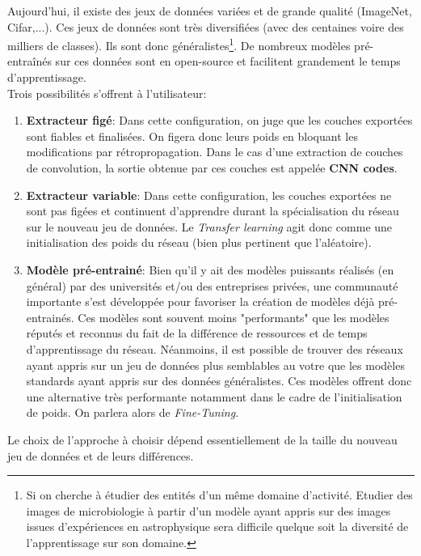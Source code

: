 \noindent Aujourd'hui, il existe des jeux de données variées et de grande qualité (ImageNet, Cifar,...). Ces jeux de données sont très diversifiées (avec des centaines voire des milliers de classes). Ils sont donc généralistes\footnote{Si on cherche à étudier des entités d'un même domaine d'activité. Etudier des images de microbiologie à partir d'un modèle ayant appris sur des images issues d'expériences en astrophysique sera difficile quelque soit la diversité de l'apprentissage sur son domaine.}. De nombreux modèles pré-entraînés sur ces données sont en open-source et facilitent grandement le temps d'apprentissage.\\

\noindent Trois possibilités s'offrent à l'utilisateur:
\begin{enumerate}
    \item \textbf{Extracteur figé}: Dans cette configuration, on juge que les couches exportées sont fiables et finalisées. On figera donc leurs poids en bloquant les modifications par rétropropagation. Dans le cas d'une extraction de couches de convolution, la sortie obtenue par ces couches est appelée \textbf{CNN codes}.

    \item \textbf{Extracteur variable}: Dans cette configuration, les couches exportées ne sont pas figées et continuent d'apprendre durant la spécialisation du réseau sur le nouveau jeu de données. Le \textit{Transfer learning} agit donc comme une initialisation des poids du réseau (bien plus pertinent que l'aléatoire).

    \item \textbf{Modèle pré-entrainé}: Bien qu'il y ait des modèles puissants réalisés (en général) par des universités et/ou des entreprises privées, une communauté importante s'est développée pour favoriser la création de modèles déjà pré-entrainés. Ces modèles sont souvent moins "performants" que les modèles réputés et reconnus du fait de la différence de ressources et de temps d'apprentissage du réseau. Néanmoins, il est possible de trouver des réseaux ayant appris sur un jeu de données plus semblables au votre que les modèles standards ayant appris sur des données généralistes. Ces modèles offrent donc une alternative très performante notamment dans le cadre de l'initialisation de poids. On parlera alors de \textit{Fine-Tuning}.

\end{enumerate}
\noindent Le choix de l'approche à choisir dépend essentiellement de la taille du nouveau jeu de données et de leurs différences.
